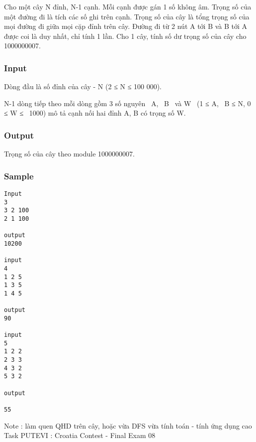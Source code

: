 

Cho một cây N đỉnh, N-1 cạnh. Mỗi cạnh được gán 1 số không âm. Trọng số của một đường đi là tích các số ghi trên cạnh. Trọng số của cây là tổng trọng số của mọi đường đi giữa mọi cặp đỉnh trên cây. Đường đi từ 2 nút A tới B và B tới A được coi là duy nhất, chỉ tính 1 lần. Cho 1 cây, tính số dư trọng số của cây cho 1000000007.

\subsubsection{Input}

Dòng đầu là số đỉnh của cây - N (2 ≤ N ≤ 100 000).

N-1 dòng tiếp theo mỗi dòng gồm 3 số nguyên  A,  B  và W  (1 ≤ A,  B ≤ N, 0 ≤ W ≤  1000) mô tả cạnh nối hai đỉnh A, B có trọng số W.

\subsubsection{Output}

Trọng số của cây theo module 1000000007. 

\subsubsection{Sample}
\begin{verbatim}
Input 
3 
3 2 100 
2 1 100 
 
output 
10200 

input 
4 
1 2 5 
1 3 5 
1 4 5 

output 
90 

input 
5 
1 2 2 
2 3 3 
4 3 2 
5 3 2 
 
output 
 
55
\end{verbatim}

Note : làm quen QHD trên cây, hoặc vừa DFS vừa tính toán - tính ứng dụng cao
\\Task PUTEVI : Croatia Contest - Final Exam 08
